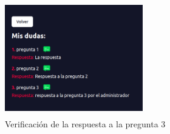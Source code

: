 \begin{figure}[h]
	\begin{center}
		\includegraphics[width=6cm, height=5cm]{respuesta3.png}
		\caption{Verificación de la respuesta a la pregunta 3}
		\label{fig:f_respuesta3}
		
	\end{center}
\end{figure}

